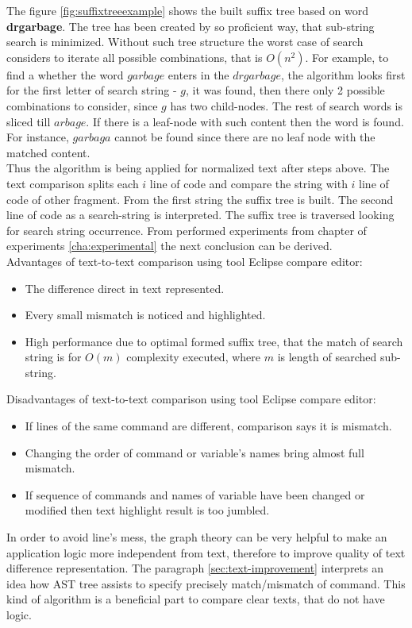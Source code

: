 \documentclass{report}
\begin{document}
The figure \ref{fig:suffixtreeexample} shows the built suffix tree based on word \textbf{drgarbage}. The tree has been created by so proficient way, that sub-string search is minimized. Without such tree structure the worst case of search considers to iterate all possible combinations, that is $O(n^2)$. For example, to find a whether the word $garbage$ enters in the $drgarbage$, the algorithm looks first for the first letter of search string - $g$, it was found, then there only 2 possible combinations to consider, since $g$ has two child-nodes. The rest of search words is sliced till $arbage$. If there is a leaf-node with such content then the word is found. For instance, $garbaga$ cannot be found since there are no leaf node with the matched content.
\\
Thus the algorithm is being applied for normalized text after steps above. The text comparison splits each $i$ line of code and compare the string with $i$ line of code of other fragment. From the first string the suffix tree is built. The second line of code as a search-string is interpreted. The suffix tree is traversed looking for search string occurrence. From performed experiments from chapter of experiments \ref{cha:experimental} the next conclusion can be derived. \\
Advantages of text-to-text comparison using tool Eclipse compare editor:
\begin{itemize}
	\item The difference direct in text represented.
	\item Every small mismatch is noticed and highlighted.
	\item High performance due to optimal formed suffix tree, that the match of search string is for $O(m)$ complexity executed, where $m$ is length of searched sub-string.
\end{itemize}
Disadvantages of text-to-text comparison using tool Eclipse compare editor:
\begin{itemize}
	\item If lines of the same command are different, comparison says it is mismatch.
	\item Changing the order of command or variable's names bring almost full mismatch.
	\item If sequence of commands and names of variable have been changed or modified then text highlight result is too jumbled.
\end{itemize}

In order to avoid line's mess, the graph theory can be very helpful to make an application logic more independent from text, therefore to improve quality of text difference representation. The paragraph \ref{sec:text-improvement} interprets an idea how AST tree assists to specify precisely match/mismatch of command. This kind of algorithm is a beneficial part to compare clear texts, that do not have logic.
\end{document}
